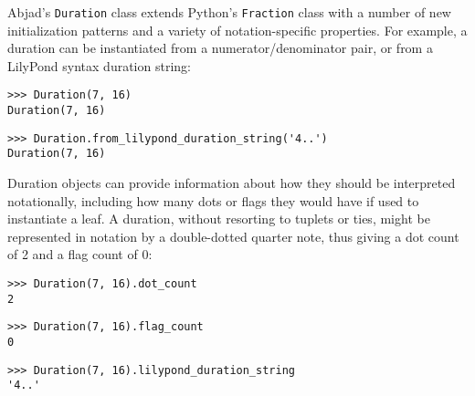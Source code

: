 Abjad's \texttt{Duration} class extends Python's \texttt{Fraction} class with a
number of new initialization patterns and a variety of notation-specific
properties. For example, a  duration can be instantiated from a
numerator/denominator pair, or from a LilyPond syntax duration string:

\begin{comment}
<abjad>
Duration(7, 16)
Duration.from_lilypond_duration_string('4..')
</abjad>
\end{comment}

\begin{abjadbookoutput}
\begin{singlespacing}
\vspace{-0.5\baselineskip}
\begin{verbatim}
>>> Duration(7, 16)
Duration(7, 16)
\end{verbatim}
\begin{verbatim}
>>> Duration.from_lilypond_duration_string('4..')
Duration(7, 16)
\end{verbatim}
\end{singlespacing}
\end{abjadbookoutput}

\noindent Duration objects can provide information about how they should be
interpreted notationally, including how many dots or flags they would have if
used to instantiate a leaf. A  duration, without resorting to
tuplets or ties, might be represented in notation by a double-dotted quarter
note, thus giving a dot count of 2 and a flag count of 0:

\begin{comment}
<abjad>
Duration(7, 16).dot_count
Duration(7, 16).flag_count
Duration(7, 16).lilypond_duration_string
</abjad>
\end{comment}

\begin{abjadbookoutput}
\begin{singlespacing}
\vspace{-0.5\baselineskip}
\begin{verbatim}
>>> Duration(7, 16).dot_count
2
\end{verbatim}
\begin{verbatim}
>>> Duration(7, 16).flag_count
0
\end{verbatim}
\begin{verbatim}
>>> Duration(7, 16).lilypond_duration_string
'4..'
\end{verbatim}
\end{singlespacing}
\end{abjadbookoutput}

